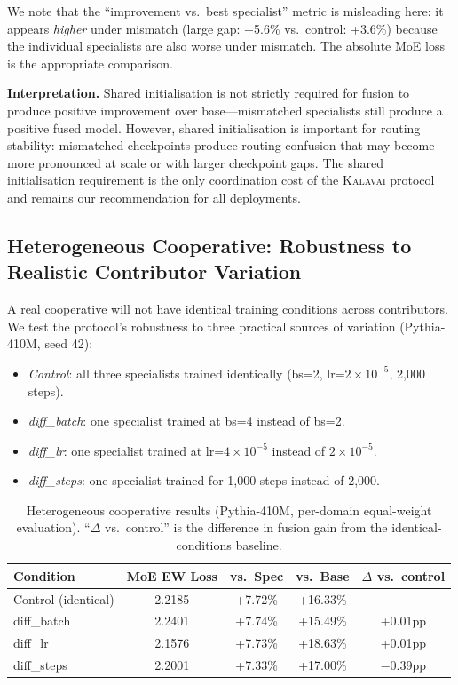 \documentclass{article}
\newcommand{\kalavai}{\textsc{Kalavai}\xspace}
\begin{document}
We note that the ``improvement vs.\ best specialist'' metric is misleading here: it appears \emph{higher} under mismatch (large gap: +5.6\% vs.\ control: +3.6\%) because the individual specialists are also worse under mismatch. The absolute MoE loss is the appropriate comparison.

\textbf{Interpretation.} Shared initialisation is not strictly required for fusion to produce positive improvement over base---mismatched specialists still produce a positive fused model. However, shared initialisation is important for routing stability: mismatched checkpoints produce routing confusion that may become more pronounced at scale or with larger checkpoint gaps. The shared initialisation requirement is the only coordination cost of the \kalavai protocol and remains our recommendation for all deployments.

\subsection{Heterogeneous Cooperative: Robustness to Realistic Contributor Variation}
\label{sec:heterogeneous}

A real cooperative will not have identical training conditions across contributors. We test the protocol's robustness to three practical sources of variation (Pythia-410M, seed 42):

\begin{itemize}[leftmargin=*, itemsep=1pt]
  \item \emph{Control}: all three specialists trained identically (bs=2, lr=$2\times10^{-5}$, 2,000 steps).
  \item \emph{diff\_batch}: one specialist trained at bs=4 instead of bs=2.
  \item \emph{diff\_lr}: one specialist trained at lr=$4\times10^{-5}$ instead of $2\times10^{-5}$.
  \item \emph{diff\_steps}: one specialist trained for 1,000 steps instead of 2,000.
\end{itemize}

\begin{table}[h]
\centering
\caption{Heterogeneous cooperative results (Pythia-410M, per-domain equal-weight evaluation). ``$\Delta$ vs.\ control'' is the difference in fusion gain from the identical-conditions baseline.}
\label{tab:heterogeneous}
\small
\begin{tabular}{lcccc}
\toprule
\textbf{Condition} & \textbf{MoE EW Loss} & \textbf{vs.\ Spec} & \textbf{vs.\ Base} & \textbf{$\Delta$ vs.\ control} \\
\midrule
Control (identical)  & 2.2185 & +7.72\% & +16.33\% & --- \\
diff\_batch          & 2.2401 & +7.74\% & +15.49\% & +0.01pp \\
diff\_lr             & 2.1576 & +7.73\% & +18.63\% & +0.01pp \\
diff\_steps          & 2.2001 & +7.33\% & +17.00\% & $-$0.39pp \\
\bottomrule
\end{tabular}
\end{table}
\end{document}
